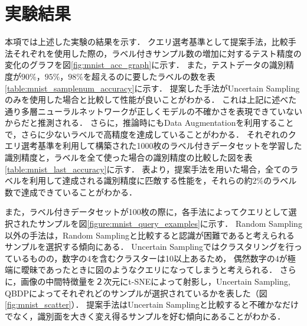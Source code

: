 \section{実験結果}
本項では上述した実験の結果を示す．
クエリ選考基準として提案手法，比較手法それぞれを使用した際の，ラベル付きサンプル数の増加に対するテスト精度の変化のグラフを図\ref{fig:mnist_acc_graph}に示す．
また，テストデータの識別精度が$90\%$，$95\%$，$98\%$を超えるのに要したラベルの数を表\ref{table:mnist_samplenum_accuracy}に示す．
提案した手法がUncertain Samplingのみを使用した場合と比較して性能が良いことがわかる．
これは上記に述べた通り多層ニューラルネットワークが正しくモデルの不確かさを表現できていないからだと推測される．
さらに，推論時にもData Augmentationを利用することで，さらに少ないラベルで高精度を達成していることがわかる．
それぞれのクエリ選考基準を利用して構築された1000枚のラベル付きデータセットを学習した識別精度と，ラベルを全て使った場合の識別精度の比較した図を表\ref{table:mnist_last_accuracy}に示す．
表より，提案手法を用いた場合，全てのラベルを利用して達成される識別精度に匹敵する性能を，それらの約$2\%$のラベル数で達成できていることがわかる．

また，ラベル付きデータセットが100枚の際に，各手法によってクエリとして選択されたサンプルを図\ref{figure:mnist_query_examples}に示す．
Random Sampling以外の手法は，Random Samplingと比較すると認識が困難であると考えられるサンプルを選択する傾向にある．
Uncertain Samplingではクラスタリングを行っているものの，数字の4を含むクラスターは10以上あるため，
偶然数字の4が極端に曖昧であったときに図のようなクエリになってしまうと考えられる．
さらに，画像の中間特徴量を２次元にt-SNEによって射影し，Uncertain Sampling, QBDPによってそれぞれどのサンプルが選択されているかを表した（図\ref{fig:mnist_scatter}）．
提案手法はUncertain Samplingと比較すると不確かなだけでなく，識別面を大きく変え得るサンプルを好む傾向にあることがわかる．



